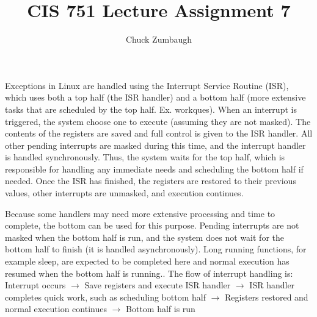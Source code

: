 \documentclass[12pt]{article}
\author{Chuck Zumbaugh}
\title{CIS 751 Lecture Assignment 7}
\begin{document}
\maketitle

Exceptions in Linux are handled using the Interrupt Service Routine (ISR), which uses both a top half (the ISR handler) and a bottom half (more extensive tasks that are scheduled by the top half. Ex. workques). When an interrupt is triggered, the system choose one to execute (assuming they are not masked). The contents of the registers are saved and full control is given to the ISR handler. All other pending interrupts are masked during this time, and the interrupt handler is handled synchronously. Thus, the system waits for the top half, which is responsible for handling any immediate needs and scheduling the bottom half if needed. Once the ISR has finished, the registers are restored to their previous values,  other interrupts are unmasked, and execution continues. 

Because some handlers may need more extensive processing and time to complete, the bottom can be used for this purpose. Pending interrupts are not masked when the bottom half is run, and the system does not wait for the bottom half to finish (it is handled asynchronously). Long running functions, for example sleep, are expected to be completed here and normal execution has resumed when the bottom half is running..
\bigbreak
The flow of interrupt handling is:
\bigbreak
Interrupt occurs $\rightarrow$ Save registers and execute ISR handler $\rightarrow$ ISR handler completes quick work, such as scheduling bottom half $\rightarrow$ Registers restored and normal execution continues $\rightarrow$ Bottom half is run 
\end{document}
